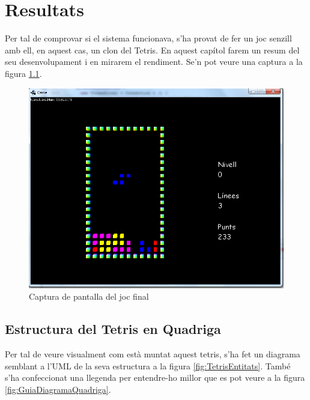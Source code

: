 \chapter{Resultats}

Per tal de comprovar si el sistema funcionava, s'ha provat de fer un joc senzill amb ell, en aquest cas, un clon del Tetris. En aquest capítol farem un resum del seu desenvolupament i en mirarem el rendiment. Se'n pot veure una captura a la figura \ref{fig:ImatgeTetris}.

\begin{figure}
  \includegraphics[width=1\linewidth]{./img/ImatgeTetris.png}
  \caption{Captura de pantalla del joc final \label{fig:ImatgeTetris}}
\end{figure}

\section{Estructura del Tetris en Quadriga}

Per tal de veure visualment com està muntat aquest tetris, s'ha fet un diagrama semblant a l'UML de la seva estructura a la figura \ref{fig:TetrisEntitats}. També s'ha confeccionat una llegenda per entendre-ho millor que es pot veure a la figura \ref{fig:GuiaDiagramaQuadriga}.

